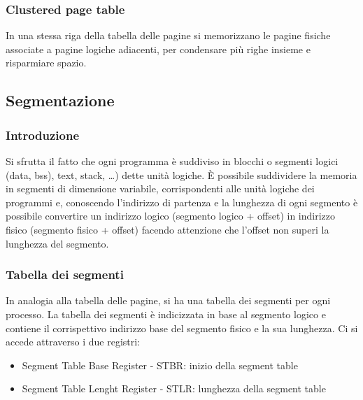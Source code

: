 \documentclass[a4paper]{article}
\begin{document}
\subsubsection*{Clustered page table}
In una stessa riga della tabella delle pagine si memorizzano le pagine fisiche associate a pagine logiche adiacenti, per
condensare più righe insieme e risparmiare spazio.


\subsection{Segmentazione}
\subsubsection*{Introduzione}
Si sfrutta il fatto che ogni programma è suddiviso in blocchi o segmenti logici (data, bss), text, stack, \dots) dette unità
logiche. È possibile suddividere la memoria in segmenti di dimensione variabile, corrispondenti alle unità logiche dei programmi
e, conoscendo l'indirizzo di partenza e la lunghezza di ogni segmento è possibile convertire un indirizzo logico (segmento logico
+ offset) in indirizzo fisico (segmento fisico + offset) facendo attenzione che l'offset non superi la lunghezza del segmento.

\subsubsection*{Tabella dei segmenti}
In analogia alla tabella delle pagine, si ha una tabella dei segmenti per ogni processo. La tabella dei segmenti è indicizzata
in base al segmento logico e contiene il corrispettivo indirizzo base del segmento fisico e la sua lunghezza. Ci si accede
attraverso i due registri:
\begin{itemize}
	\item Segment Table Base Register - STBR: inizio della segment table
	\item Segment Table Lenght Register - STLR: lunghezza della segment table
\end{itemize}
\end{document}

